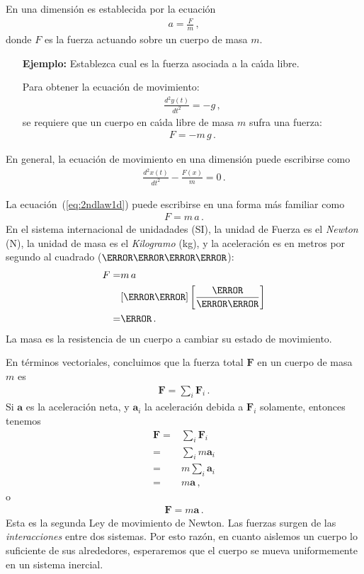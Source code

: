 \begin{borrar}
En una dimensi\'on es establecida por la ecuaci\'on
\begin{align}
  \label{eq:2ndlaw1d}
  a=\frac{F}{m}\,,
\end{align}
donde $F$ es la fuerza actuando sobre un cuerpo de masa $m$. 

\begin{itemize}
\item[\textbf{Ejemplo:}] Establezca cual es la fuerza asociada a la ca\'\i da libre.

Para obtener la ecuaci\'on de movimiento:
\begin{align}
  \frac{d^2y(t)}{dt^2}=-g\,,
\end{align}
se requiere que un cuerpo en ca\'\i da libre de masa $m$ sufra una fuerza:
\begin{align}
  F=-m\,g\,.
\end{align}

\end{itemize}

En general, la ecuaci\'on de movimiento en una dimensi\'on puede escribirse como
\begin{align}
  \frac{d^2x(t)}{dt^2}-\frac{F(x)}{m}=0\,.
\end{align}

La ecuaci\'on~(\ref{eq:2ndlaw1d}) puede escribirse en una forma m\'as familiar como
\begin{align}
  F=m\,a\,.
\end{align}
En el sistema internacional de unidadades (SI), la unidad de Fuerza es el \emph{Newton} (N), la unidad de masa es el \emph{Kilogramo} (kg), y la aceleraci\'on es en metros por segundo al cuadrado ($\metre\per\second\squared$):
\begin{align}
  F=&m\,a\nonumber\\
&[\kilo\gram]
\left[\frac{\meter}{\second\squared}\right]\nonumber\\
=&\newton\,.
\end{align}
La masa es la resistencia de un cuerpo a cambiar su estado de movimiento.

En t\'erminos vectoriales, concluimos que la fuerza total $\mathbf{F}$ en un cuerpo de masa $m$ es
\begin{align}
  \mathbf{F}=\sum_i \mathbf{F}_i\,.
\end{align}
Si $\mathbf{a}$ es la aceleraci\'on neta, y $\mathbf{a}_i$ la aceleraci\'on debida a $\mathbf{F}_i$ solamente, entonces tenemos
\begin{align}
  \mathbf{F}=&\sum_i \mathbf{F}_i\nonumber\\
  =&\sum_i m\mathbf{a}_i\nonumber\\
  =&m\sum_i \mathbf{a}_i\nonumber\\
  =&m\mathbf{a}\,,
\end{align}
o
\begin{align}
  \label{eq:fma}
  \mathbf{F}=m\mathbf{a}\,.
\end{align}
Esta es la segunda Ley de movimiento de Newton. Las fuerzas surgen de las \emph{interacciones} entre dos sistemas. Por esto raz\'on, en cuanto aislemos un cuerpo lo suficiente de sus alrededores, esperaremos que el cuerpo se mueva uniformemente en un sistema inercial.


\end{borrar}

